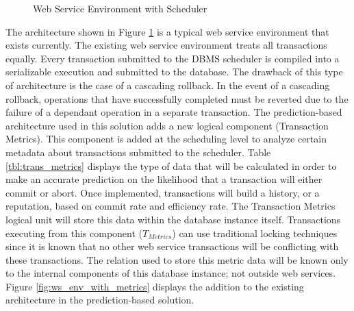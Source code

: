 \documentclass[conference]{IEEEtran}
\begin{document}
\begin{figure}[h]
\captionsetup{justification=centering}
\centering %


\caption{Web Service Environment with Scheduler} %
\label{fig:ws_env} %

\end{figure}

The architecture shown in Figure \ref{fig:ws_env} is a typical web service environment that exists currently. The existing web service environment treats all transactions equally. Every transaction submitted to the DBMS scheduler is compiled into a serializable execution and submitted to the database. The drawback of this type of architecture is the case of a cascading rollback. In the event of a cascading rollback, operations that have successfully completed must be reverted due to the failure of a dependant operation in a separate transaction. The prediction-based architecture used in this solution adds a new logical component (Transaction Metrics). This component is added at the scheduling level to analyze certain metadata about transactions submitted to the scheduler. Table \ref{tbl:trans_metrics} displays the type of data that will be calculated in order to make an accurate prediction on the likelihood that a transaction will either commit or abort. Once implemented, transactions will build a history, or a reputation, based on commit rate and efficiency rate. The Transaction Metrics logical unit will store this data within the database instance itself. Transactions executing from this component ($T_{Metrics}$) can use traditional locking techniques since it is known that no other web service transactions will be conflicting with these transactions. The relation used to store this metric data will be known only to the internal components of this database instance; not outside web services. Figure \ref{fig:ws_env_with_metrics} displays the addition to the existing architecture in the prediction-based solution.
\end{document}
